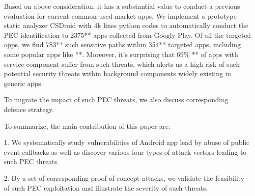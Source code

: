 
Based on above consideration, it has a substantial value to conduct a previous evaluation for current common-used market apps. We implement a prototype static analyzer CSDroid with 4k lines python codes to automatically conduct the PEC identification to 2375** apps collected from Googly Play. Of all the targeted apps, we find 783** such sensitive paths within 354** targeted apps, including some popular apps like **. Moreover, it's surprising that 69\% **  of apps with service component suffer from such threats, which alerts us a high risk of such potential security threats within background components widely existing in generic apps.  


To migrate the impact of such PEC threats, we also discuss corresponding defence strategy. 

To summarize, the main contribution of this paper are:

1. We systematically study vulnerabilities of Android app lead by abuse of public event callbacks as well as discover various {\color{red}four} types of attack vectors leading to such PEC threats. 
 
2. By a set of corresponding proof-of-concept attacks, we validate the feasibility of such PEC exploitation and illustrate the severity of such threats. 

